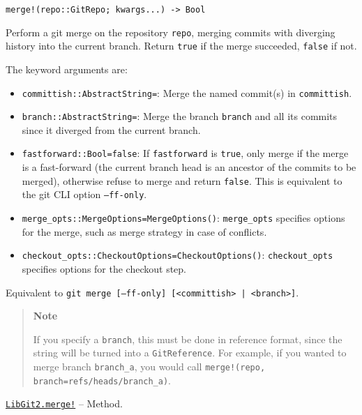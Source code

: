\begin{adjustwidth}{2em}{0pt}


\begin{verbatim}
merge!(repo::GitRepo; kwargs...) -> Bool
\end{verbatim}

Perform a git merge on the repository \texttt{repo}, merging commits with diverging history into the current branch. Return \texttt{true} if the merge succeeded, \texttt{false} if not.

The keyword arguments are:

\begin{itemize}
\item \texttt{committish::AbstractString={\textquotedbl}{\textquotedbl}}: Merge the named commit(s) in \texttt{committish}.


\item \texttt{branch::AbstractString={\textquotedbl}{\textquotedbl}}: Merge the branch \texttt{branch} and all its commits since it diverged from the current branch.


\item \texttt{fastforward::Bool=false}: If \texttt{fastforward} is \texttt{true}, only merge if the merge is a fast-forward (the current branch head is an ancestor of the commits to be merged), otherwise refuse to merge and return \texttt{false}. This is equivalent to the git CLI option \texttt{--ff-only}.


\item \texttt{merge\_opts::MergeOptions=MergeOptions()}: \texttt{merge\_opts} specifies options for the merge, such as merge strategy in case of conflicts.


\item \texttt{checkout\_opts::CheckoutOptions=CheckoutOptions()}: \texttt{checkout\_opts} specifies options for the checkout step.

\end{itemize}
Equivalent to \texttt{git merge [--ff-only] [<committish> | <branch>]}.

\begin{quote}
\textbf{Note}

If you specify a \texttt{branch}, this must be done in reference format, since the string will be turned into a \texttt{GitReference}. For example, if you wanted to merge branch \texttt{branch\_a}, you would call \texttt{merge!(repo, branch={\textquotedbl}refs/heads/branch\_a{\textquotedbl})}.

\end{quote}


\end{adjustwidth}
\hypertarget{6081828016566889200}{} 
\hyperlink{6081828016566889200}{\texttt{LibGit2.merge!}}  -- {Method.}

